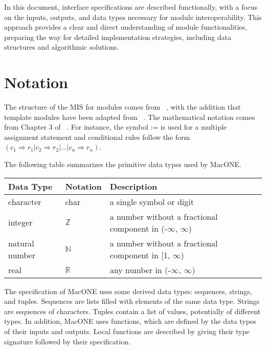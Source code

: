 \documentclass[12pt, titlepage]{article}
\begin{document}
In this document, interface specifications are described functionally, with a focus on the inputs, outputs, and data types necessary for module interoperability. This approach provides a clear and direct understanding of module functionalities, preparing the way for detailed implementation strategies, including data structures and algorithmic solutions.


\section{Notation}

The structure of the MIS for modules comes from ~\citet{HoffmanAndStrooper1995},
with the addition that template modules have been adapted from
~\citet{GhezziEtAl2003}.  The mathematical notation comes from Chapter 3 of
~\citet{HoffmanAndStrooper1995}.  For instance, the symbol := is used for a
multiple assignment statement and conditional rules follow the form $(c_1
\Rightarrow r_1 | c_2 \Rightarrow r_2 | ... | c_n \Rightarrow r_n )$.

The following table summarizes the primitive data types used by MacONE. 

\begin{center}
\renewcommand{\arraystretch}{1.2}
\noindent 
\begin{tabular}{l l p{7.5cm}} 
\toprule 
\textbf{Data Type} & \textbf{Notation} & \textbf{Description}\\ 
\midrule
character & char & a single symbol or digit\\
integer & $\mathbb{Z}$ & a number without a fractional component in (-$\infty$, $\infty$) \\
natural number & $\mathbb{N}$ & a number without a fractional component in [1, $\infty$) \\
real & $\mathbb{R}$ & any number in (-$\infty$, $\infty$)\\
\bottomrule
\end{tabular} 
\end{center}

\noindent
The specification of MacONE uses some derived data types: sequences, strings, and
tuples. Sequences are lists filled with elements of the same data type. Strings
are sequences of characters. Tuples contain a list of values, potentially of
different types. In addition, MacONE uses functions, which
are defined by the data types of their inputs and outputs. Local functions are
described by giving their type signature followed by their specification.
\end{document}
